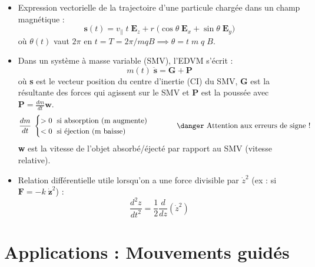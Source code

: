 \documentclass[a4paper]{article}
\begin{document}
\begin{itemize}
\item Expression vectorielle de la trajectoire d'une particule chargée dans un champ magnétique : 
\[ \textbf{s}(t) = v_\parallel \; t \; \textbf{E}_z + r\;  \big( \cos \theta \; \textbf{E}_x + \sin \theta \; \textbf{E}_y \big) \]
où $ \theta (t) $ vaut $ 2 \pi $ en $ t = T = 2 \pi / m q B \implies \theta = t \; m \; q \; B $.





\item Dans un système à masse variable (SMV), l'EDVM s'écrit : 
\[ m(t) \; \ddot{\textbf{s}} = \textbf{G} + \textbf{P} \]
où \textbf{s} est le vecteur position du centre d'inertie (CI) du SMV, \textbf{G} est la résultante des forces qui agissent sur le SMV et \textbf{P} est la poussée avec $\displaystyle \textbf{P} = \frac{d m}{d t} \textbf{w} $. \\
\[ \frac{d m}{d t} \; \begin{cases}
> 0 \; \text{ si absorption (m augmente) } \\
< 0 \; \text{ si éjection (m baisse) }
\end{cases} \qquad \text{ \danger Attention aux erreurs de signe ! } \]
\textbf{w} est la vitesse de l'objet absorbé/éjecté par rapport au SMV (vitesse relative).





\item Relation différentielle utile lorsqu'on a une force divisible par $ \dot{z}^2 $ (ex : si $ \textbf{F} = - k \; \dot{\textbf{z}}^2 $) : 
\[ \frac{d^2 z}{d t^2} = \frac{1}{2} \frac{d}{d z} (\dot{z}^2) \]





\end{itemize}




















\section{Applications : Mouvements guidés}
\end{document}
